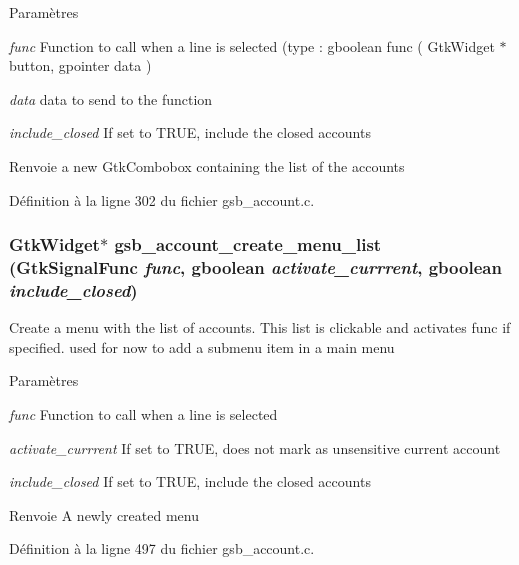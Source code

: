 \begin{DoxyParams}{Paramètres}
\item[{\em func}]Function to call when a line is selected (type : gboolean func ( GtkWidget $\ast$button, gpointer data ) \item[{\em data}]data to send to the function \item[{\em include\_\-closed}]If set to TRUE, include the closed accounts\end{DoxyParams}
\begin{DoxyReturn}{Renvoie}
a new GtkCombobox containing the list of the accounts 
\end{DoxyReturn}


Définition à la ligne 302 du fichier gsb\_\-account.c.

\subsubsection[{gsb\_\-account\_\-create\_\-menu\_\-list}]{\setlength{\rightskip}{0pt plus 5cm}GtkWidget$\ast$ gsb\_\-account\_\-create\_\-menu\_\-list (GtkSignalFunc {\em func}, \/  gboolean {\em activate\_\-currrent}, \/  gboolean {\em include\_\-closed})}\label{gsb__account_8h_ac49429f60593df9fe4e9674cd8645fc2}
Create a menu with the list of accounts. This list is clickable and activates func if specified. used for now to add a submenu item in a main menu


\begin{DoxyParams}{Paramètres}
\item[{\em func}]Function to call when a line is selected \item[{\em activate\_\-currrent}]If set to TRUE, does not mark as unsensitive current account \item[{\em include\_\-closed}]If set to TRUE, include the closed accounts\end{DoxyParams}
\begin{DoxyReturn}{Renvoie}
A newly created menu 
\end{DoxyReturn}


Définition à la ligne 497 du fichier gsb\_\-account.c.

